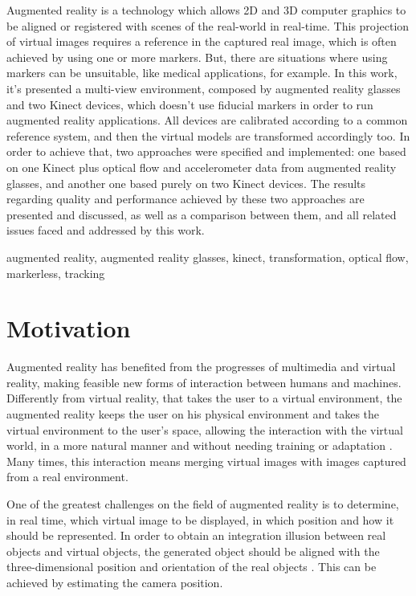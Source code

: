 \documentclass[msc, a4paper, classic, en]{ufbathesis}
\begin{document}
\abstract
Augmented reality is a technology which allows 2D and 3D computer graphics to be aligned or registered with scenes of the real-world in real-time. This projection of virtual images requires a reference in the captured real image, which is often achieved by using one or more markers. But, there are situations where using markers can be unsuitable, like medical applications, for example. In this work, it's presented a multi-view environment, composed by augmented reality glasses and two Kinect devices, which doesn't use fiducial markers in order to run augmented reality applications. All devices are calibrated according to a common reference system, and then the virtual models are transformed accordingly too. In order to achieve that, two approaches were specified and implemented: one based on one Kinect plus optical flow and accelerometer data from augmented reality glasses, and another one based purely on two Kinect devices. The results regarding quality and performance achieved by these two approaches are presented and discussed, as well as a comparison between them, and all related issues faced and addressed by this work.
\begin{keywords}
augmented reality, augmented reality glasses, kinect, transformation, optical flow, markerless, tracking
\end{keywords}

\tableofcontents
\listoffigures
\listoftables

\mainmatter

\section{Motivation}

Augmented reality has benefited from the progresses of multimedia and virtual reality, making feasible new forms of
interaction between humans and machines. Differently from virtual reality, that takes the user to a virtual environment, the augmented
reality keeps the user on his physical environment and takes the virtual environment to the user's space, allowing the interaction with
the virtual world, in a more natural manner and without needing training or adaptation \cite{tori2006fundamentos}. Many times, this interaction means
merging virtual images with images captured from a real environment.

One of the greatest challenges on the field of augmented reality is to determine, in real time, which virtual image to be displayed,
in which position and how it should be represented. In order to obtain an integration illusion between real objects and virtual objects,
the generated object should be aligned with the three-dimensional position and orientation of the real objects \cite{gallo11}. This can be achieved
by estimating the camera position.
\end{document}
